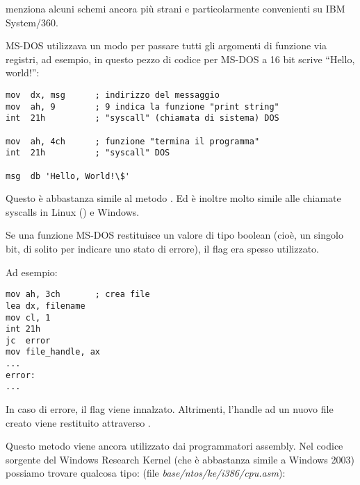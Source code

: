  menziona alcuni schemi ancora più strani e particolarmente convenienti su IBM System/360.


MS-DOS utilizzava un modo per passare tutti gli argomenti di funzione via registri, ad esempio, in questo pezzo
di codice per MS-DOS a 16 bit scrive ``Hello, world!'':

\begin{lstlisting}[style=customasmx86]
mov  dx, msg      ; indirizzo del messaggio
mov  ah, 9        ; 9 indica la funzione "print string"
int  21h          ; "syscall" (chiamata di sistema) DOS

mov  ah, 4ch      ; funzione "termina il programma"
int  21h          ; "syscall" DOS

msg  db 'Hello, World!\$'
\end{lstlisting}

Questo è abbastanza simile al metodo .
Ed è inoltre molto simile alle chiamate syscalls in Linux () e Windows.

Se una funzione MS-DOS restituisce un valore di tipo boolean (cioè, un singolo bit, di solito per indicare uno stato di errore),
il flag  era spesso utilizzato.

Ad esempio:

\begin{lstlisting}[style=customasmx86]
mov ah, 3ch       ; crea file
lea dx, filename
mov cl, 1
int 21h
jc  error
mov file_handle, ax
...
error:
...
\end{lstlisting}

In caso di errore, il flag  viene innalzato. Altrimenti, l'handle ad un nuovo file creato viene restituito attraverso .

Questo metodo viene ancora utilizzato dai programmatori assembly.
Nel codice sorgente del Windows Research Kernel (che è abbastanza simile a Windows 2003) possiamo trovare qualcosa tipo:
(file \emph{base/ntos/ke/i386/cpu.asm}):

